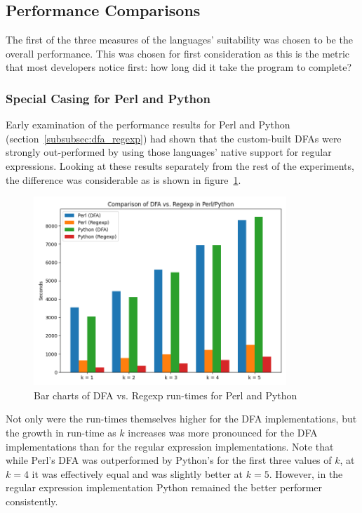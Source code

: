 \subsection{Performance Comparisons}
\label{subsec:perf_comp}

The first of the three measures of the languages' suitability was chosen to be the overall performance. This was chosen for first consideration as this is the metric that most developers notice first: how long did it take the program to complete?

\subsubsection{Special Casing for Perl and Python}
\label{subsubsec:results:perf_perl_python}

Early examination of the performance results for Perl and Python (section~\ref{subsubsec:dfa_regexp}) had shown that the custom-built DFAs were strongly out-performed by using those languages' native support for regular expressions. Looking at these results separately from the rest of the experiments, the difference was considerable as is shown in figure~\ref{fig:graph:dfa_regexp_comp}.

\begin{figure}[h]
	\centering
	\includegraphics[width=0.85\textwidth]{figures/dfa_regexp_comp.png}
	\caption{Bar charts of DFA vs. Regexp run-times for Perl and Python}
	\label{fig:graph:dfa_regexp_comp}
\end{figure}

Not only were the run-times themselves higher for the DFA implementations, but the growth in run-time as $k$ increases was more pronounced for the DFA implementations than for the regular expression implementations. Note that while Perl's DFA was outperformed by Python's for the first three values of $k$, at $k=4$ it was effectively equal and was slightly better at $k=5$. However, in the regular expression implementation Python remained the better performer consistently.

